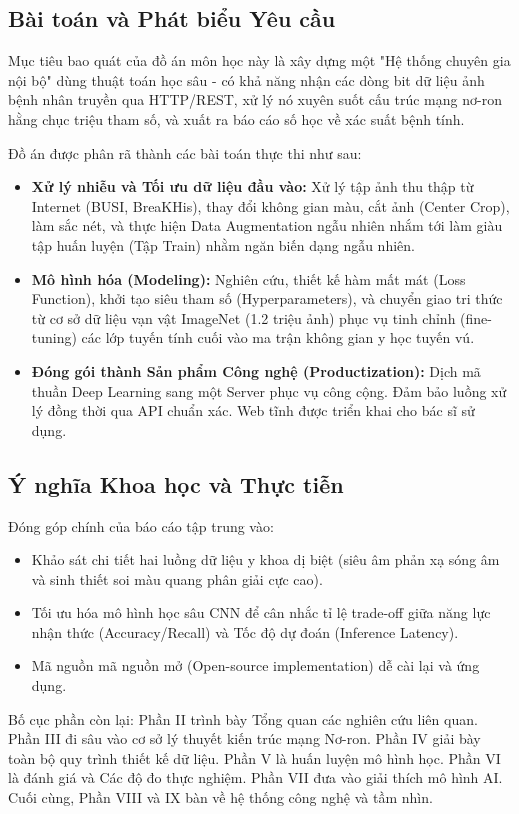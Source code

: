 \documentclass[conference,a4paper]{IEEEtran}
\begin{document}
\subsection{Bài toán và Phát biểu Yêu cầu}
Mục tiêu bao quát của đồ án môn học này là xây dựng một "Hệ thống chuyên gia nội bộ" dùng thuật toán học sâu - có khả năng nhận các dòng bit dữ liệu ảnh bệnh nhân truyền qua HTTP/REST, xử lý nó xuyên suốt cấu trúc mạng nơ-ron hằng chục triệu tham số, và xuất ra báo cáo số học về xác suất bệnh tính.

Đồ án được phân rã thành các bài toán thực thi như sau:
\begin{itemize}
\item \textbf{Xử lý nhiễu và Tối ưu dữ liệu đầu vào:} Xử lý tập ảnh thu thập từ Internet (BUSI, BreaKHis), thay đổi không gian màu, cắt ảnh (Center Crop), làm sắc nét, và thực hiện Data Augmentation ngẫu nhiên nhắm tới làm giàu tập huấn luyện (Tập Train) nhằm ngăn biến dạng ngẫu nhiên.
\item \textbf{Mô hình hóa (Modeling):} Nghiên cứu, thiết kế hàm mất mát (Loss Function), khởi tạo siêu tham số (Hyperparameters), và chuyển giao tri thức từ cơ sở dữ liệu vạn vật ImageNet (1.2 triệu ảnh) phục vụ tinh chỉnh (fine-tuning) các lớp tuyến tính cuối vào ma trận không gian y học tuyến vú.
\item \textbf{Đóng gói thành Sản phẩm Công nghệ (Productization):} Dịch mã thuần Deep Learning sang một Server phục vụ công cộng. Đảm bảo luồng xử lý đồng thời qua API chuẩn xác. Web tĩnh được triển khai cho bác sĩ sử dụng.
\end{itemize}

\subsection{Ý nghĩa Khoa học và Thực tiễn}
Đóng góp chính của báo cáo tập trung vào:
\begin{itemize}
\item Khảo sát chi tiết hai luồng dữ liệu y khoa dị biệt (siêu âm phản xạ sóng âm và sinh thiết soi màu quang phân giải cực cao).
\item Tối ưu hóa mô hình học sâu CNN để cân nhắc tỉ lệ trade-off giữa năng lực nhận thức (Accuracy/Recall) và Tốc độ dự đoán (Inference Latency).
\item Mã nguồn mã nguồn mở (Open-source implementation) dễ cài lại và ứng dụng.
\end{itemize}

Bố cục phần còn lại: Phần II trình bày Tổng quan các nghiên cứu liên quan. Phần III đi sâu vào cơ sở lý thuyết kiến trúc mạng Nơ-ron. Phần IV giải bày toàn bộ quy trình thiết kế dữ liệu. Phần V là huấn luyện mô hình học. Phần VI là đánh giá và Các độ đo thực nghiệm. Phần VII đưa vào giải thích mô hình AI. Cuối cùng, Phần VIII và IX bàn về hệ thống công nghệ và tầm nhìn.
\end{document}
